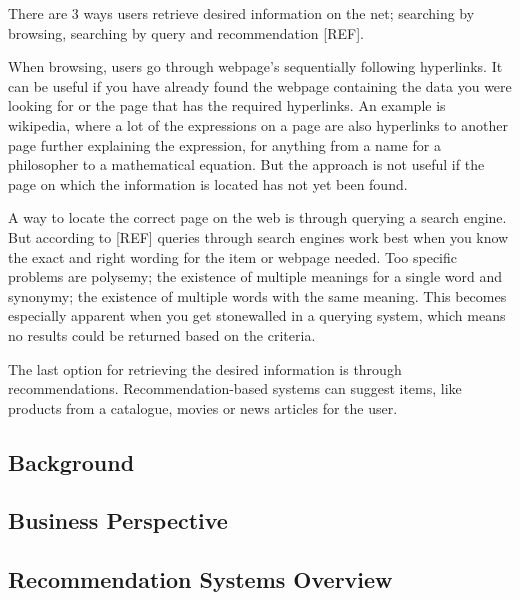 There are 3 ways users retrieve desired information on the net; searching by browsing, searching by query and recommendation [REF].

When browsing, users go through webpage's sequentially following hyperlinks. It can be useful if you have already found the webpage containing the data you were looking for or the page that has the required hyperlinks. An example is wikipedia, where a lot of the expressions on a page are also hyperlinks to another page further explaining the expression, for anything from a name for a philosopher to a mathematical equation. But the approach is not useful if the page on which the information is located has not yet been found.

A way to locate the correct page on the web is through querying a search engine. But according to [REF] queries through search engines work best when you know the exact and right wording for the item or webpage needed. Too specific problems are polysemy; the existence of multiple meanings for a single word and synonymy; the existence of multiple words with the same meaning. This becomes especially apparent when you get stonewalled in a querying system, which means no results could be returned based on the criteria.

The last option for retrieving the desired information is through recommendations. Recommendation-based systems can suggest items, like products from a catalogue, movies or news articles for the user.

\subsection{Background}
\label{Background}

\subsection{Business Perspective}
\label{BusiPers}

\subsection{Recommendation Systems Overview}
\label{Overview}
